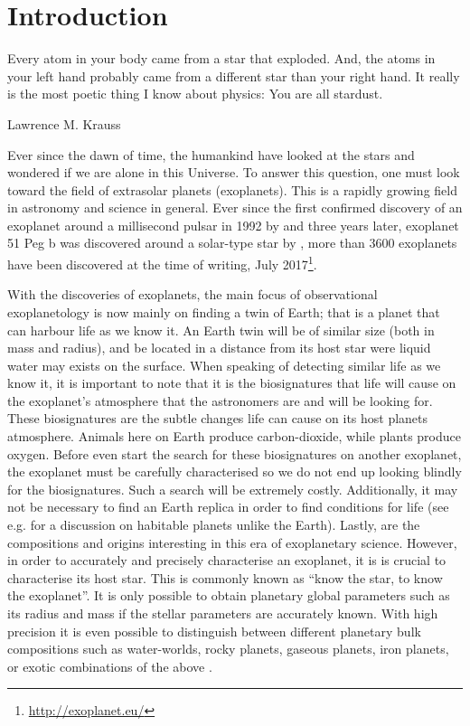 \chapter{Introduction}
\label{cha:introduction}
\epigraph{Every atom in your body came from a star that exploded. And, the atoms in your left hand
          probably came from a different star than your right hand. It really is the most poetic
          thing I know about physics: You are all stardust.}{Lawrence M. Krauss}

Ever since the dawn of time, the humankind have looked at the stars and wondered if we are alone in
this Universe. To answer this question, one must look toward the field of extrasolar planets
(exoplanets). This is a rapidly growing field in astronomy and science in general. Ever since the
first confirmed discovery of an exoplanet around a millisecond pulsar in 1992 by
\citet{Wolszczan1992} and three years later, exoplanet 51 Peg b was discovered around a solar-type
star by \citet{Mayor1995}, more than 3600 exoplanets have been discovered at the time of writing,
July 2017\footnote{\url{http://exoplanet.eu/}}.

With the discoveries of exoplanets, the main focus of observational exoplanetology is now mainly on
finding a twin of Earth; that is a planet that can harbour life as we know it. An Earth twin will be
of similar size (both in mass and radius), and be located in a distance from its host star were
liquid water may exists on the surface. When speaking of detecting similar life as we know it, it is
important to note that it is the biosignatures that life will cause on the exoplanet's atmosphere
that the astronomers are and will be looking for. These biosignatures are the subtle changes life
can cause on its host planets atmosphere. Animals here on Earth produce carbon-dioxide, while plants
produce oxygen. Before even start the search for these biosignatures on another exoplanet, the
exoplanet must be carefully characterised so we do not end up looking blindly for the biosignatures.
Such a search will be extremely costly. Additionally, it may not be necessary to find an Earth
replica in order to find conditions for life (see e.g. \citet{Alibert2014} for a discussion on
habitable planets unlike the Earth). Lastly, are the compositions and origins interesting in this
era of exoplanetary science. However, in order to accurately and precisely characterise an
exoplanet, it is is crucial to characterise its host star. This is commonly known as ``know the
star, to know the exoplanet''. It is only possible to obtain planetary global parameters such as its
radius and mass if the stellar parameters are accurately known. With high precision it is even
possible to distinguish between different planetary bulk compositions such as water-worlds, rocky
planets, gaseous planets, iron planets, or exotic combinations of the above \citep[see
e.g.][]{Dorn2015,Thiabaud2014}.

